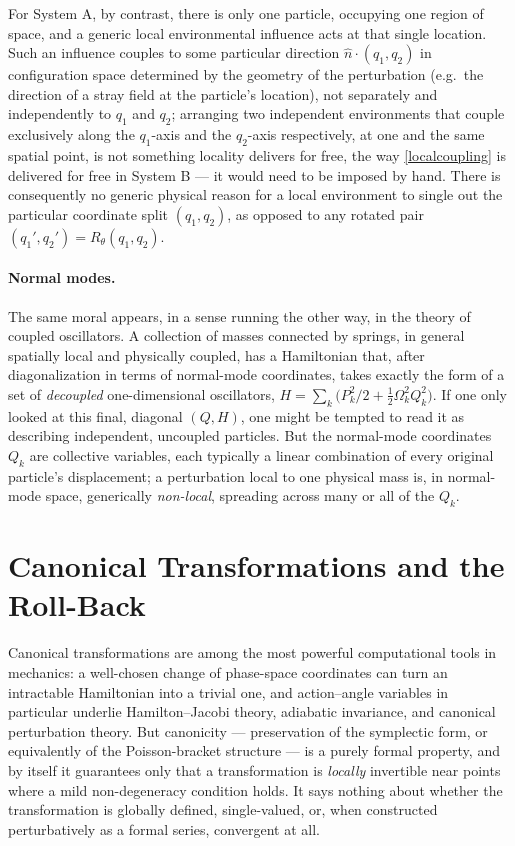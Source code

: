 For System A, by contrast, there is only one particle, occupying one region of
space, and a generic local environmental influence acts at that single
location. Such an influence couples to some particular direction $\hat
n\cdot(q_1,q_2)$ in configuration space determined by the geometry of the
perturbation (e.g.\ the direction of a stray field at the particle's location),
not separately and independently to $q_1$ and $q_2$; arranging two independent
environments that couple exclusively along the $q_1$-axis and the $q_2$-axis
respectively, at one and the same spatial point, is not something locality
delivers for free, the way \eqref{localcoupling} is delivered for free in
System B --- it would need to be imposed by hand. There is consequently no
generic physical reason for a local environment to single out the particular
coordinate split $(q_1,q_2)$, as opposed to any rotated pair
$(q_1',q_2')=R_\theta(q_1,q_2)$.

\paragraph{Normal modes.} The same moral appears, in a sense running the other
way, in the theory of coupled oscillators. A collection of masses connected by
springs, in general spatially local and physically coupled, has a Hamiltonian
that, after diagonalization in terms of normal-mode coordinates, takes exactly
the form of a set of \emph{decoupled} one-dimensional oscillators, $H=\sum_k
\big(P_k^2/2+\frac12\Omega_k^2 Q_k^2\big)$. If one only looked at this final,
diagonal $(Q,H)$, one might be tempted to read it as describing independent,
uncoupled particles. But the normal-mode coordinates $Q_k$ are collective
variables, each typically a linear combination of every original particle's
displacement; a perturbation local to one physical mass is, in normal-mode
space, generically \emph{non-local}, spreading across many or all of the $Q_k$.

\section{Canonical Transformations and the Roll-Back }

Canonical transformations are among the most powerful computational tools in
mechanics: a well-chosen change of phase-space coordinates can turn an
intractable Hamiltonian into a trivial one, and action--angle variables in
particular underlie Hamilton--Jacobi theory, adiabatic invariance, and
canonical perturbation theory. But canonicity --- preservation of the
symplectic form, or equivalently of the Poisson-bracket structure --- is a
purely formal property, and by itself it guarantees only that a transformation
is \emph{locally} invertible near points where a mild non-degeneracy condition
holds. It says nothing about whether the transformation is globally defined,
single-valued, or, when constructed perturbatively as a formal series,
convergent at all. 

